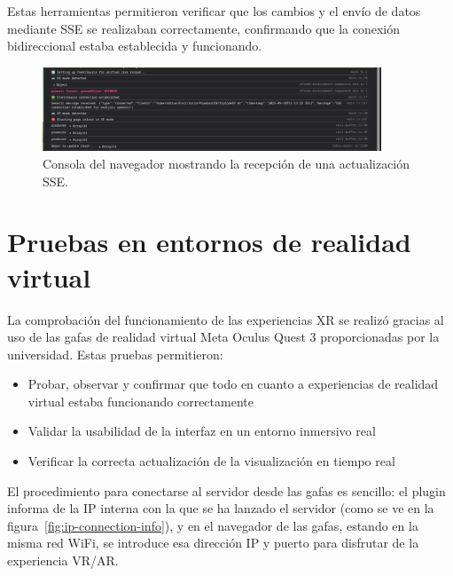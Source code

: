 \documentclass[a4paper, 12pt]{book}
\begin{document}
Estas herramientas permitieron verificar que los cambios y el envío de datos mediante SSE se realizaban correctamente, confirmando que la conexión bidireccional estaba establecida y funcionando.


\begin{figure}[H]
\centering
\includegraphics[width=0.9\textwidth]{img/sse-updates-browser.png}
\caption{Consola del navegador mostrando la recepción de una actualización SSE.}
\label{fig:sse-updates-browser}
\end{figure}

\section{Pruebas en entornos de realidad virtual}
\label{sec:pruebas-vr}

La comprobación del funcionamiento de las experiencias XR se realizó gracias al uso de las gafas de realidad virtual Meta Oculus Quest 3 proporcionadas por la universidad. Estas pruebas permitieron:

\begin{itemize}
  \item Probar, observar y confirmar que todo en cuanto a experiencias de realidad virtual estaba funcionando correctamente
  \item Validar la usabilidad de la interfaz en un entorno inmersivo real
  \item Verificar la correcta actualización de la visualización en tiempo real
\end{itemize}

El procedimiento para conectarse al servidor desde las gafas es sencillo: el plugin informa de la IP interna con la que se ha lanzado el servidor (como se ve en la figura~\ref{fig:ip-connection-info}), y en el navegador de las gafas, estando en la misma red WiFi, se introduce esa dirección IP y puerto para disfrutar de la experiencia VR/AR.

\end{document}
